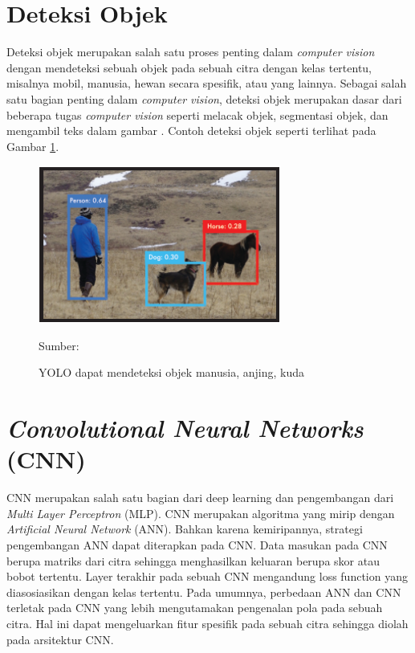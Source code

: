 \section{Deteksi Objek}
Deteksi objek merupakan salah satu proses penting dalam \textit{computer vision} dengan mendeteksi sebuah objek pada sebuah citra dengan kelas tertentu, misalnya mobil, manusia, hewan secara spesifik, atau yang lainnya. Sebagai salah satu bagian penting dalam \textit{computer vision}, deteksi objek merupakan dasar dari beberapa tugas \textit{computer vision} seperti melacak objek, segmentasi objek, dan mengambil teks dalam gambar \citep{Zou2019}. Contoh deteksi objek seperti terlihat pada Gambar \ref{fig:obj-det}.

\begin{figure}[H]
    \begin{center}
        \includegraphics[width=8cm]{../img/Object Detection - Latex.png}
        \caption{YOLO dapat mendeteksi objek manusia, anjing, kuda}
        \label{fig:obj-det}
        Sumber: \citep{Redmon2016a}
    \end{center}
\end{figure}

\section{\textit{Convolutional Neural Networks} (CNN)}
CNN merupakan salah satu bagian dari deep learning dan pengembangan dari \textit{Multi Layer Perceptron} (MLP). CNN merupakan algoritma yang mirip dengan \textit{Artificial Neural Network} (ANN). Bahkan karena kemiripannya, strategi pengembangan ANN dapat diterapkan pada CNN. Data masukan pada CNN berupa matriks dari citra sehingga menghasilkan keluaran berupa skor atau bobot tertentu. Layer terakhir pada sebuah CNN mengandung loss function yang diasosiasikan dengan kelas tertentu. Pada umumnya, perbedaan ANN dan CNN terletak pada CNN yang lebih mengutamakan pengenalan pola pada sebuah citra. Hal ini dapat mengeluarkan fitur spesifik pada sebuah citra sehingga diolah pada arsitektur CNN.

